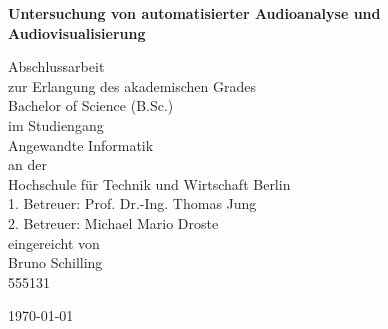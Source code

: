 \documentclass[11pt,a4paper]{article}
\begin{document}
\begin{titlepage}
\centering

\vspace*{10pt}
\scshape
{\huge \textbf{Untersuchung von automatisierter Audioanalyse und Audiovisualisierung} \par}

\vspace{70pt}
\large
Abschlussarbeit\\

\vspace{10pt}
\Large
zur Erlangung des akademischen Grades\\
Bachelor of Science (B.Sc.)\\

\vspace{30pt}
\large
im Studiengang\\

\Large
Angewandte Informatik\\

\vspace{30pt}
\large
an der\\

\Large
Hochschule für Technik und Wirtschaft Berlin\\

\vspace{30pt}
\Large
1. Betreuer: Prof. Dr.-Ing. Thomas Jung\\
2. Betreuer: Michael Mario Droste\\

\vspace{30pt}
\large
eingereicht von\\

\Large
Bruno Schilling\\
\large
555131\\

\vfill
{\large \today\par}
\end{titlepage}

\newpage

\tableofcontents
\newpage

\end{document}
